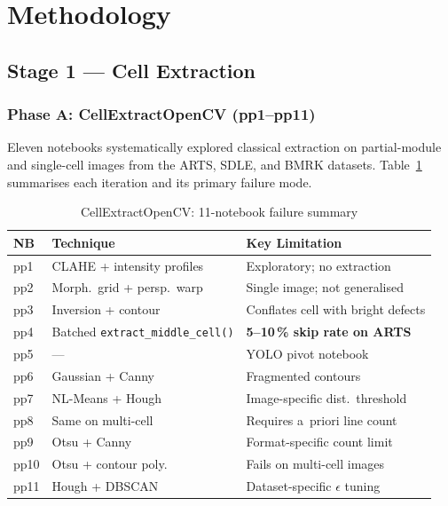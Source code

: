 \documentclass[conference]{IEEEtran}
\begin{document}
\section{Methodology}

\subsection{Stage 1 --- Cell Extraction}
\label{sec:stage1}

\subsubsection{Phase A: CellExtractOpenCV (pp1--pp11)}

Eleven notebooks systematically explored classical extraction
on partial-module and single-cell images from the ARTS, SDLE,
and BMRK datasets. Table~\ref{tab:classical_cell} summarises
each iteration and its primary failure mode.

\begin{table}[t]
  \caption{CellExtractOpenCV: 11-notebook failure summary}
  \label{tab:classical_cell}
  \begin{center}
  \renewcommand{\arraystretch}{1.05}
  \small
  \begin{tabular}{p{0.8cm}p{2.0cm}p{3.5cm}}
    \toprule
    \textbf{NB} & \textbf{Technique} &
    \textbf{Key Limitation} \\
    \midrule
    pp1  & CLAHE + intensity profiles & Exploratory; no extraction \\
    pp2  & Morph.\ grid + persp.\ warp & Single image; not generalised \\
    pp3  & Inversion + contour & Conflates cell with bright defects \\
    pp4  & Batched \texttt{extract\_middle\_cell()} & \textbf{5--10\,\% skip rate on ARTS} \\
    pp5  & ---                  & YOLO pivot notebook \\
    pp6  & Gaussian + Canny     & Fragmented contours \\
    pp7  & NL-Means + Hough     & Image-specific dist.\ threshold \\
    pp8  & Same on multi-cell   & Requires a~priori line count \\
    pp9  & Otsu + Canny         & Format-specific count limit \\
    pp10 & Otsu + contour poly. & Fails on multi-cell images \\
    pp11 & Hough + DBSCAN       & Dataset-specific $\epsilon$ tuning \\
    \bottomrule
  \end{tabular}
  \end{center}
\end{table}
\end{document}
